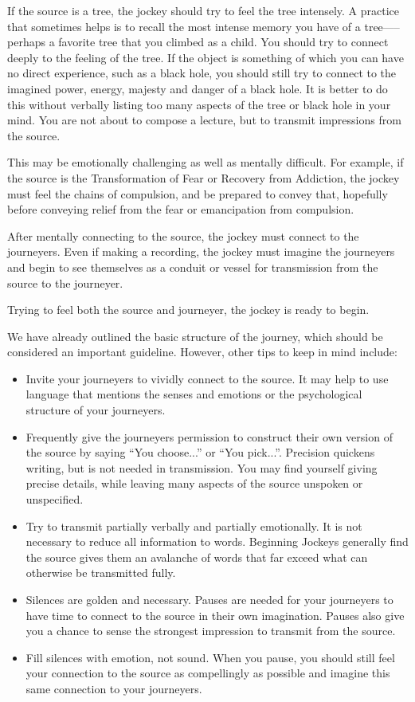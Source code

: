 \documentclass[12pt]{book}
\begin{document}
If the source is a tree, the jockey should try to feel the tree
intensely. A practice that sometimes helps is to recall the most
intense memory you have of a tree—--perhaps a favorite tree that you
climbed as a child. You should try to connect deeply to the feeling of
the tree. If the object is something of which you can have no direct
experience, such as a black hole, you should still try to connect to
the imagined power, energy, majesty and danger of a black hole. It is
better to do this without verbally listing too many aspects of the
tree or black hole in your mind. You are not about to compose a
lecture, but to transmit impressions from the source.
					
This may be emotionally challenging as well as mentally difficult. For
example, if the source is the Transformation of Fear or Recovery from
Addiction, the jockey must feel the chains of compulsion, and
be prepared to convey that, hopefully before conveying relief from the
fear or emancipation from compulsion.
					
After mentally connecting to the source, the jockey must connect to
the journeyers. Even if making a recording, the jockey must imagine
the journeyers and begin to see themselves as a conduit or vessel for
transmission from the source to the journeyer.
					
Trying to feel both the source and journeyer, the jockey is ready to
begin.
					
We have already outlined the basic structure of the journey, which
should be considered an important guideline. However, other tips to
keep in mind include:
					

	\begin{itemize}
\item 
  Invite your journeyers to vividly connect to the source. It may help
  to use language that mentions the senses and emotions or the
  psychological structure of your journeyers.
\item 		
  Frequently give the journeyers permission to construct their own
  version of the source by saying ``You choose...'' or ``You
  pick...''.  Precision quickens writing, but is not needed in
  transmission. You may find yourself giving precise details,
  while leaving many aspects of the source unspoken or unspecified.
\item 		
  Try to transmit partially verbally and partially emotionally. It is
  not necessary to reduce all information to words. Beginning Jockeys
  generally find the source gives them an avalanche of words that far
  exceed what can otherwise be transmitted fully.
\item 		
Silences are golden and necessary. Pauses are needed for your
journeyers to have time to connect to the source in their own
imagination.  Pauses also give you a chance to sense the strongest
impression to transmit from the source.
\item 
Fill silences with emotion, not sound. When you pause, you should
still feel your connection to the source as compellingly as possible
and imagine this same connection to your journeyers.
\end{itemize}
  
\end{document}
